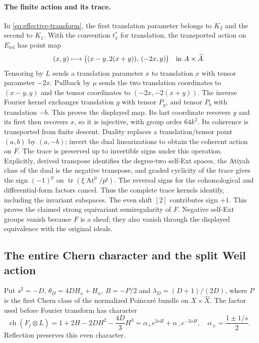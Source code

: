 \paragraph{The finite action and its trace.}
In \eqref{eq:effective-transform}, the first translation parameter belongs to $K_2$ and
the second to $K_1$. With the convention $t_x^*$ for translation,
the transported action on $E_{\mathrm{ref}}$ has point map
\begin{equation}\label{eq:effective-action}
 (x,y)\longmapsto
 \bigl((x-y,2(x+y)),\,(-2x,y)\bigr)
 \quad\hbox{in }A\times\widehat A.                       
\end{equation}
Tensoring by $L$ sends a translation parameter $x$ to translation $x$ with tensor parameter $-2x$. Pullback by $\mu$ sends the two translation coordinates to $(x-y,y)$ and the tensor coordinates to $(-2x,-2(x+y))$. The inverse Fourier kernel exchanges translation $y$ with tensor $P_y$, and tensor $P_b$ with translation $-b$. This proves the displayed map. Its last coordinate recovers $y$ and its first then recovers $x$, so it is injective, with group order $64k^2$. Its coherence is transported from finite descent. Duality replaces a translation/tensor
point $(a,b)$ by $(a,-b)$; invert the dual linearizations to obtain
the coherent action on $F$. The trace is preserved up to invertible
signs under this operation. Explicitly, derived transpose identifies
the degree-two self-Ext spaces, the Atiyah class of the dual is
the negative transpose, and graded cyclicity of the trace gives
the sign $(-1)^p$ on
$\operatorname{tr}(\xi\operatorname{At}^p/p!)$.
The reversal signs for the cohomological and differential-form
factors cancel. Thus the complete trace kernels identify, including
the invariant subspaces. The even shift $[2]$ contributes sign $+1$.
This proves the claimed strong equivariant semiregularity of $F$.
Negative self-Ext groups vanish because $F$ is a sheaf; they also
vanish through the displayed equivalence with the original ideals.

\subsection{The entire Chern character and the split Weil action}
Put $s^2=-D$, $\theta_D=4DH_x+H_\alpha$, $B=-P/2$ and $\lambda_D=(D+1)/(2D)$, where $P$ is the first Chern class of the normalized Poincar\'e bundle on $X\times\widehat X$. The factor used before Fourier transform has character
\[
 \operatorname{ch}(F_j\otimes L)=1+2H-2DH^2-\frac{4D}{3}H^3
     =\alpha_+e^{2sH}+\alpha_-e^{-2sH},
 \quad\alpha_\pm=\frac{1\pm1/s}{2}.
\]
Reflection preserves this even character.

